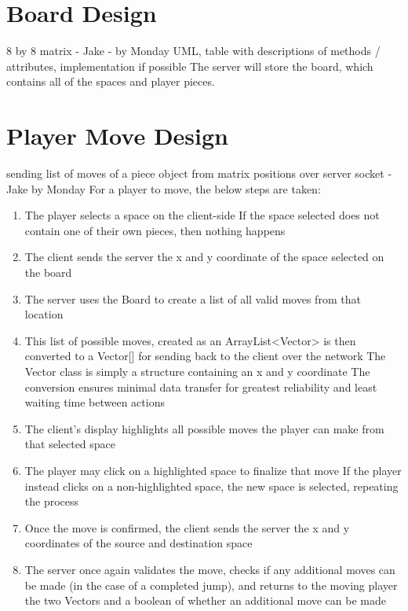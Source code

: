 \documentclass{scrreprt}
\begin{document}
	\section{Board Design}
		\item 8 by 8 matrix - Jake - by Monday 
		UML, table with descriptions of methods / attributes, implementation if possible 
		The server will store the board, which contains all of the spaces and player pieces.
	\section{Player Move Design}
		\item  sending list of moves of a piece object from matrix positions over server socket - Jake by Monday
		For a player to move, the below steps are taken:
		\begin{enumerate}
		\item The player selects a space on the client-side
			\subitem If the space selected does not contain one of their own pieces, then nothing happens
		\item The client sends the server the x and y coordinate of the space selected on the board
		\item The server uses the Board to create a list of all valid moves from that location
		\item This list of possible moves, created as an ArrayList<Vector> is then converted to a Vector[] for sending back to the client over the network
			\subitem The Vector class is simply a structure containing an x and y coordinate
			\subitem The conversion ensures minimal data transfer for greatest reliability and least waiting time between actions
		\item The client's display highlights all possible moves the player can make from that selected space
		\item The player may click on a highlighted space to finalize that move
			\subitem If the player instead clicks on a non-highlighted space, the new space is selected, repeating the process
		\item Once the move is confirmed, the client sends the server the x and y coordinates of the source and destination space
		\item The server once again validates the move, checks if any additional moves can be made (in the case of a completed jump), and returns to the moving player the two Vectors and a boolean of whether an additional move can be made
		\end{enumerate}
		
\end{document}
